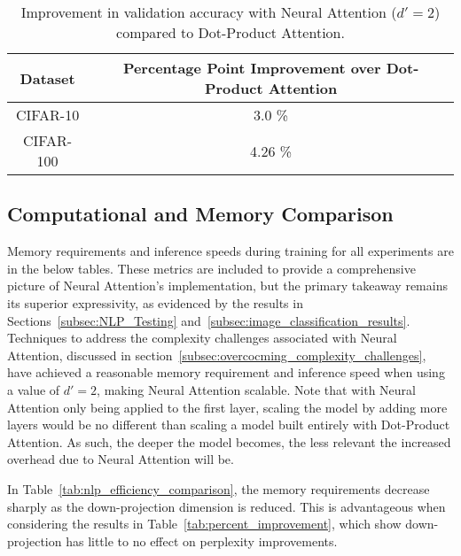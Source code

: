 \documentclass{article}
\begin{document}
\begin{table}[H]
    \centering
    \caption{Improvement in validation accuracy with Neural Attention ($d'=2$) compared to Dot-Product Attention.}
    \label{tab:accuracy_improvement_simple}
    \begin{tabular}{|c|c|}
        \hline
        \textbf{Dataset} & \textbf{Percentage Point Improvement over Dot-Product Attention} \\ \hline
        CIFAR-10  & 3.0 \% \\ \hline
        CIFAR-100 & 4.26 \% \\ \hline
    \end{tabular}
\end{table}

\label{others}

\subsection{Computational and Memory Comparison}
\label{subsec:computational_and_memory_comparison}
Memory requirements and inference speeds during training for all experiments are in the below tables. These metrics are included to provide a comprehensive picture of Neural Attention's implementation, but the primary takeaway remains its superior expressivity, as evidenced by the results in Sections~\ref{subsec:NLP_Testing} and~\ref{subsec:image_classification_results}. Techniques to address the complexity challenges associated with Neural Attention, discussed in section~\ref{subsec:overcocming_complexity_challenges}, have achieved a reasonable memory requirement and inference speed when using a value of $d'=2$, making Neural Attention scalable. Note that with Neural Attention only being applied to the first layer, scaling the model by adding more layers would be no different than scaling a model built entirely with Dot-Product Attention. As such, the deeper the model becomes, the less relevant the increased overhead due to Neural Attention will be. 

In Table~\ref{tab:nlp_efficiency_comparison}, the memory requirements decrease sharply as the down-projection dimension is reduced. This is advantageous when considering the results in Table~\ref{tab:percent_improvement}, which show down-projection has little to no effect on perplexity improvements.
\end{document}
